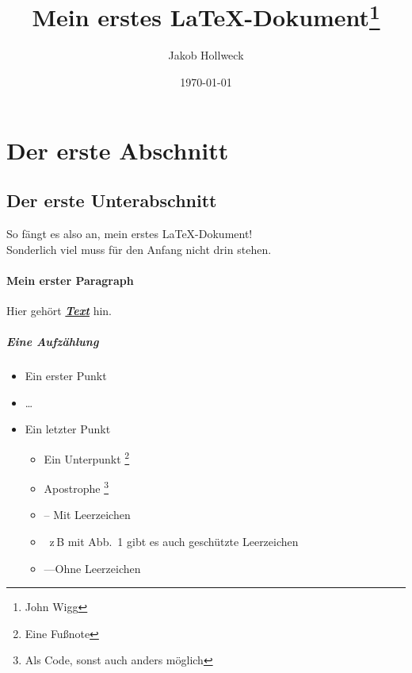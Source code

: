 \documentclass[a4paper, 10pt,onecolumn]{scrartcl}
\title{Mein erstes \LaTeX-Dokument\thanks{John Wigg}}
\author{Jakob Hollweck} %
\date{\today}
\begin{document}
\tableofcontents
\maketitle
\section{Der erste Abschnitt}
\subsection{Der erste Unterabschnitt}

So fängt es also an, mein erstes \LaTeX-Dokument!\\
Sonderlich viel muss für den Anfang nicht drin stehen.

\paragraph{Mein erster Paragraph}

Hier gehört \textbf{\underline{\emph{Text}}} hin.
\subparagraph{Eine Aufzählung}
\begin{itemize}
	\item Ein erster Punkt
	\item \dots
	\item Ein letzter Punkt
	\begin{itemize}
		\item Ein Unterpunkt \footnote[10]{Eine Fußnote}
		\item Apostrophe \footnote{Als Code, sonst auch anders möglich} 
		\item \glqq{}--\grqq{} Mit Leerzeichen
		\item \glq\-\grq\, z\,B mit Abb.~1 gibt es auch geschützte Leerzeichen
		\item \glqq---\grqq Ohne Leerzeichen
	\end{itemize}
\end{itemize}
\end{document}
